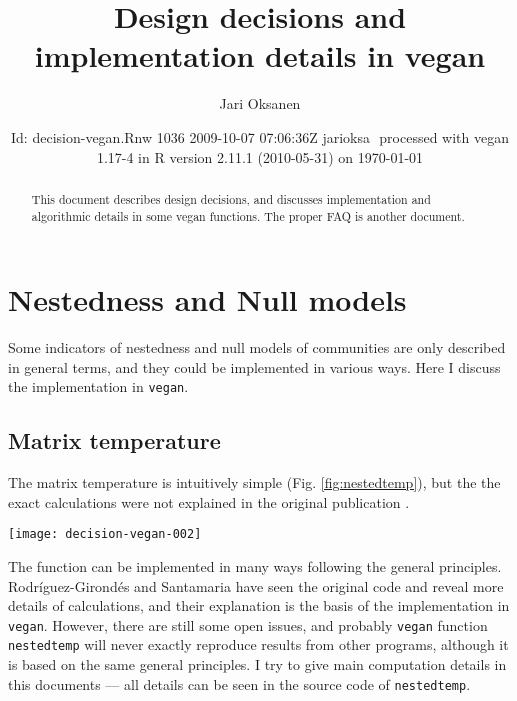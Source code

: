\documentclass[a4paper,10pt]{amsart}
\author{Jari Oksanen}
\title{Design decisions and implementation details in vegan}
\date{$ $Id: decision-vegan.Rnw 1036 2009-10-07 07:06:36Z jarioksa $ $
  processed with vegan
1.17-4
in R version 2.11.1 (2010-05-31) on \today}
\begin{document}

\maketitle

\begin{abstract}

\noindent This document describes design decisions, and discusses implementation
and algorithmic details in some vegan functions. The proper FAQ is
another document.

\end{abstract}

\tableofcontents

\section{Nestedness and Null models}

Some indicators of nestedness and null models of communities are only
described in general terms, and they could be implemented in various
ways. Here I discuss the implementation in \texttt{vegan}.

\subsection{Matrix temperature}

The matrix temperature is intuitively simple
(Fig. \ref{fig:nestedtemp}), but the the exact calculations were not
explained in the original publication \cite{AtmarPat93}.
\begin{SCfigure}
\texttt{[image: decision-vegan-002]}
\label{fig:nestedtemp}
\caption{Matrix temperature for \emph{Falco subbuteo} on island 1
  (dot; Sibbo Svartholmen). The curve is the fill line, and in a cold
  matrix, all presences (red squares) should be in the upper left
  corner behind the fill line. Dashed diagonal line of length $D$ goes
  through the point, and an arrow of length $d$ connects the point to
  the fill line. The ``surprise'' for this point is $u = (d/D)^2$ and
  the matrix temperature is based on the sum of surprises: presences
  outside the fill line or absences within the fill line.}
\end{SCfigure}
The function can be implemented in many ways following the general
principles.  Rodr{\'i}guez-Girond{\'e}s and Santamaria \cite{RodGir06}
have seen the original code and reveal more details of calculations,
and their explanation is the basis of the implementation in
\texttt{vegan}.  However, there are still some open issues, and
probably \texttt{vegan} function \texttt{nestedtemp} will never
exactly reproduce results from other programs, although it is based on
the same general principles. I try to give main computation details in
this documents --- all details can be seen in the source code of
\texttt{nestedtemp}.
\end{document}
